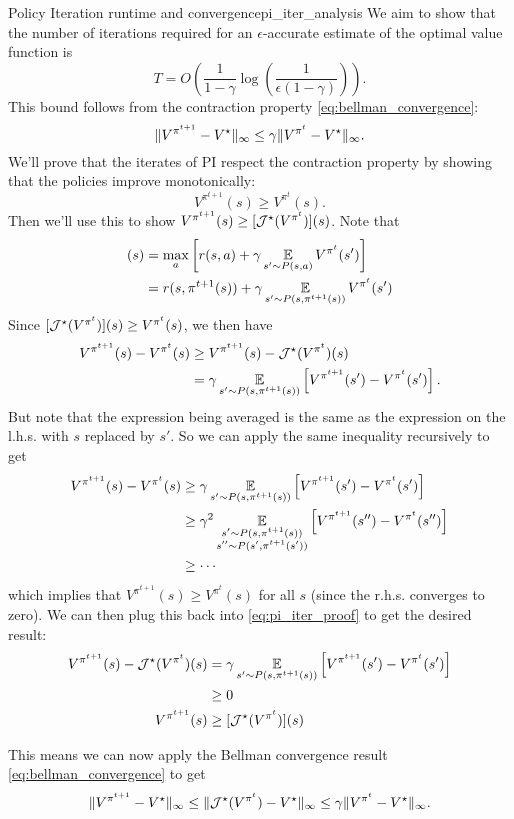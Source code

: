 \documentclass[\main/main]{subfiles}
\begin{document}
\begin{theorem}{Policy Iteration runtime and convergence}{pi_iter_analysis}
We aim to show that the number of iterations required for an $\epsilon$-accurate estimate of the optimal value function is
\[
    T = O\left( \frac{1}{1-\gamma} \log\left(\frac{1}{\epsilon (1-\gamma)}\right) \right).
\]
This bound follows from the contraction property \eqref{eq:bellman_convergence}:
\[
    \|V^{\pi^{t+1}} - V^\star \|_{\infty} \le \gamma \|V^{\pi^{t}} - V^\star \|_{\infty}.
\]
We'll prove that the iterates of PI respect the contraction property by showing that the policies improve monotonically:
\[
    V^{\pi^{t+1}}(s) \ge V^{\pi^{t}}(s).
\]
Then we'll use this to show $V^{\pi^{t+1}}(s) \ge [\mathcal{J}^{\star}(V^{\pi^{t}})](s)$. Note that
\begin{align*}
    [\bop^{\star} (V^{\pi^{t}})](s) &= \max_a \left[ r(s, a) + \gamma \E_{s' \sim P(s, a)} V^{\pi^{t}}(s') \right] \\
    &= r(s, \pi^{t+1}(s)) + \gamma \E_{s' \sim P(s, \pi^{t+1}(s))} V^{\pi^{t}}(s')
\end{align*}
Since $[\mathcal{J}^{\star}(V^{\pi^{t}})](s) \ge V^{\pi^{t}}(s)$, we then have
\begin{equation}
    \begin{aligned}
        V^{\pi^{t+1}}(s) - V^{\pi^{t}}(s) &\ge V^{\pi^{t+1}}(s) - \mathcal{J}^{\star} (V^{\pi^{t}})(s) \\
        &= \gamma \operatorname*{\mathbb{E}}_{s' \sim P(s, \pi^{t+1}(s))} \left[V^{\pi^{t+1}}(s') -  V^{\pi^{t}}(s') \right].
    \end{aligned} \label{eq:pi_iter_proof}
\end{equation}
But note that the expression being averaged is the same as the expression on the l.h.s. with $s$ replaced by $s'$. So we can apply the same inequality recursively to get
\begin{align*}
    V^{\pi^{t+1}}(s) - V^{\pi^{t}}(s) &\ge  \gamma \operatorname*{\mathbb{E}}_{s' \sim P(s, \pi^{t+1}(s))} \left[V^{\pi^{t+1}}(s') -  V^{\pi^{t}}(s') \right] \\
    &\ge \gamma^2 \operatorname*{\mathbb{E}}_{\substack{s' \sim P(s, \pi^{t+1}(s)) \\ s'' \sim P(s', \pi^{t+1}(s'))}} \left[V^{\pi^{t+1}}(s'') -  V^{\pi^{t}}(s'') \right]\\
    &\ge \cdots
\end{align*}
which implies that $V^{\pi^{t+1}}(s) \ge V^{\pi^{t}}(s)$ for all $s$ (since the r.h.s. converges to zero). We can then plug this back into \eqref{eq:pi_iter_proof} to get the desired result:
\begin{align*}
    V^{\pi^{t+1}}(s) - \mathcal{J}^{\star} (V^{\pi^{t}})(s) &= \gamma \operatorname*{\mathbb{E}}_{s' \sim P(s, \pi^{t+1}(s))} \left[V^{\pi^{t+1}}(s') -  V^{\pi^{t}}(s') \right] \\
    &\ge 0 \\
    V^{\pi^{t+1}}(s) &\ge [\mathcal{J}^{\star}(V^{\pi^{t}})](s)
\end{align*}

This means we can now apply the Bellman convergence result \eqref{eq:bellman_convergence} to get
\[
    \|V^{\pi^{t+1}} - V^\star \|_{\infty} \le \|\mathcal{J}^{\star} (V^{\pi^{t}}) - V^\star\|_{\infty} \le \gamma \|V^{\pi^{t}} - V^\star \|_{\infty}.
\]
\end{theorem}
\end{document}
